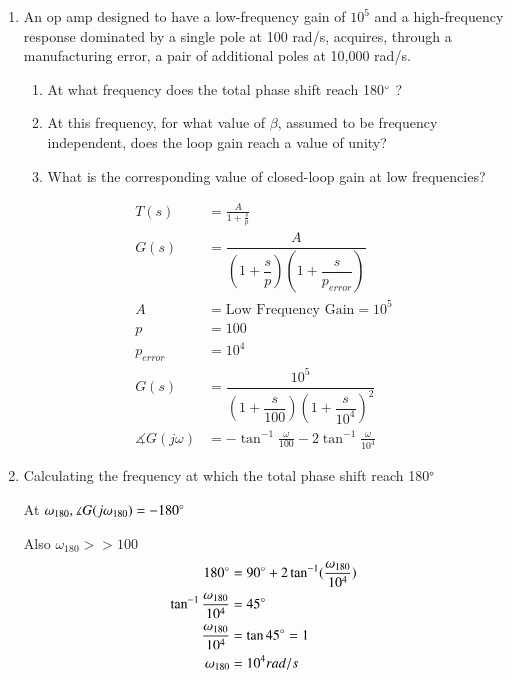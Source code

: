 \begin{enumerate}[label=\thesection.\arabic*.,ref=\thesection.\theenumi]
\item An op amp designed to have a low-frequency gain of $10^{5}$ and a high-frequency response dominated by a single pole at 100 rad/s, acquires, through a manufacturing error, a pair of additional poles at 10,000 rad/s. 
\begin{enumerate}
\item At what frequency does the total phase shift reach 180$\degree$ ? 
\item At this frequency, for what value of $\beta$, assumed to be frequency independent, does the loop gain reach a value of unity? 
\item What is the corresponding value of closed-loop gain at low frequencies?
\end{enumerate}
\solution
\begin{align}
T(s) &= \frac{A}{1+\frac{s}{p}} 
\\
G(s) &= \dfrac{A}{(1+\dfrac{s}{p})(1+\dfrac{s}{p_{error}})} 
\\
A &= \text{Low Frequency Gain} = 10^{5}
\\
p &= 100
\\
p_{error} &= 10^{4}
\\
G(s) &= \dfrac{10^{5}}{(1+\dfrac{s}{100})(1+\dfrac{s}{10^{4}})^{2}}
\\
\measuredangle G(j\omega) &= -\tan^{-1}\frac{\omega}{100} - 2\tan^{-1}\frac{\omega}{10^{4}}
\end{align}
\item Calculating the frequency at which the total phase shift reach 180$\degree$ 

At $\omega_{180}, \measuredangle G(j\omega_{180}) = -180\degree$

Also $\omega_{180} >> 100$
\begin{align}
180\degree &= 90\degree  + 2 \tan^{-1}(\frac{\omega_{180}}{10^{4}})
\\
\tan^{-1}\frac{\omega_{180}}{10^{4}}&= 45\degree
\\
\frac{\omega_{180}}{10^{4}} &= \tan 45\degree = 1
\\
\omega_{180} &= 10^{4} rad/s
\end{align}


\end{enumerate}
